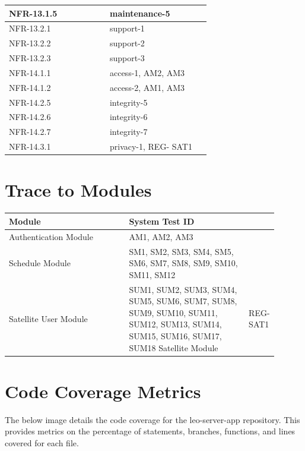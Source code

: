 \documentclass[12pt, titlepage]{article}
\begin{document}
\begin{longtable}{|p{0.45\linewidth}|p{0.45\linewidth}|}
\hline
NFR-13.1.5 & maintenance-5 \\
\hline
NFR-13.2.1 & support-1 \\
\hline
NFR-13.2.2 & support-2 \\
\hline
NFR-13.2.3 & support-3 \\
\hline
NFR-14.1.1 & access-1, AM2, AM3 \\
\hline
NFR-14.1.2 & access-2, AM1, AM3 \\
\hline
NFR-14.2.5 & integrity-5 \\
\hline
NFR-14.2.6 & integrity-6 \\
\hline
NFR-14.2.7 & integrity-7 \\
\hline
NFR-14.3.1 & privacy-1, REG-
SAT1 \\
\hline
\end{longtable}


\section{Trace to Modules}	

\begin{longtable}{|p{0.45\linewidth}|p{0.45\linewidth}|}
\hline
\textbf{Module} & \textbf{System Test ID} \\
\hline
Authentication Module & AM1, AM2, AM3 \\
\hline
Schedule Module & SM1, SM2, SM3, SM4, SM5, SM6, SM7, SM8, SM9, SM10, SM11, SM12 \\
\hline
Satellite User Module & SUM1, SUM2, SUM3, SUM4, SUM5, SUM6, SUM7, SUM8, SUM9, SUM10, SUM11, SUM12, SUM13, SUM14, SUM15, SUM16, SUM17, SUM18
\hline
Satellite Module & REG-SAT1 \\
\hline
\end{longtable}
\newpage
\section{Code Coverage Metrics}

The below image details the code coverage for the leo-server-app repository. This provides metrics on the percentage of statements, branches, functions, and lines covered for each file.
\end{document}

